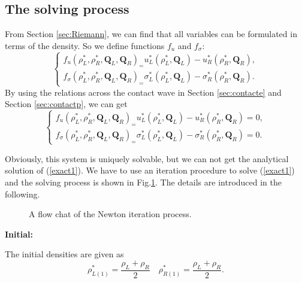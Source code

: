 \documentclass{article}
\numberwithin{equation}{section}
\numberwithin{table}{section}
\begin{document}
  \subsection{The solving process}\label{sec:iteration}
From Section  \ref{sec:Riemann}, we can find that all variables can be formulated in terms of the  density. So we define functions $f_u$ and $f_\sigma$: 
\begin{equation} 
\left\{
\begin{array}{c}
  f_u(\rho_L^*,\rho_R^*,\mathbf{Q}_{L},\mathbf{Q}_{R})_=  u_L^*(\rho_L^*,\mathbf{Q}_{L}) -u_R^*(\rho_R^*,\mathbf{Q}_{R}), \\
  f_\sigma(\rho_L^*,\rho_R^*,\mathbf{Q}_{L},\mathbf{Q}_{R})_=  \sigma_L^*(\rho_L^*,\mathbf{Q}_{L}) -\sigma_R^*(\rho_R^*,\mathbf{Q}_{R}).
\end{array}
\right.
\end{equation}
By using the relations across the contact wave in Section \ref{sec:contacte} and Section \ref{sec:contactp}, we can get
\begin{equation} \label{exact1}
\left\{
\begin{array}{c}
  f_u(\rho_L^*,\rho_R^*,\mathbf{Q}_{L},\mathbf{Q}_{R})_=  u_L^*(\rho_L^*,\mathbf{Q}_{L}) -u_R^*(\rho_R^*,\mathbf{Q}_{R})=0, \\
  f_\sigma(\rho_L^*,\rho_R^*,\mathbf{Q}_{L},\mathbf{Q}_{R})_=  \sigma_L^*(\rho_L^*,\mathbf{Q}_{L}) -\sigma_R^*(\rho_R^*,\mathbf{Q}_{R})=0.
\end{array}
\right.
\end{equation}

Obviously, this system is uniquely solvable, but we can not get the analytical solution of (\ref{exact1}). We have to use an iteration procedure to solve (\ref{exact1}) and
the solving process is shown in Fig.\ref{fig:newton}. The details are introduced in the following.
\begin{figure}
  \centering
  \caption{A flow chat of the Newton iteration process.}
  \label{fig:newton}
\end{figure}


\noindent  \textbf{Initial:}

	The initial densities are given as
\begin{equation}
  \rho_{L(1)}^* = \frac{\rho_L+\rho_R}{2} \quad \rho_{R(1)}^* = \frac{\rho_L+\rho_R}{2}.
\end{equation}
\end{document}
